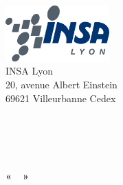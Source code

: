 \begin{center}
	\begin{minipage}[t]{0.48\textwidth}
	  \begin{flushleft}
	    \includegraphics [width=40mm]{images/logo_INSA.png} \\[0.5cm]
			INSA Lyon\\
			20, avenue Albert Einstein\\
			69621 Villeurbanne Cedex
	  \end{flushleft}
	\end{minipage}
	\begin{minipage}[t]{0.48\textwidth}
	  \begin{flushright}
	  \end{flushright}
	\end{minipage} \\[2cm]

	\textsc{\Large \reportsubject}\\[0.3cm]
	\HRule \\[0.4cm]
	{\Huge \bfseries \reporttitle}\\[0.3cm]
	{\LARGE \bfseries «~\stagetopic~»}\\[0.3cm]
	{\Large \dateperiod}\\[0.4cm]
	\HRule \\[1cm]


\end{center}
